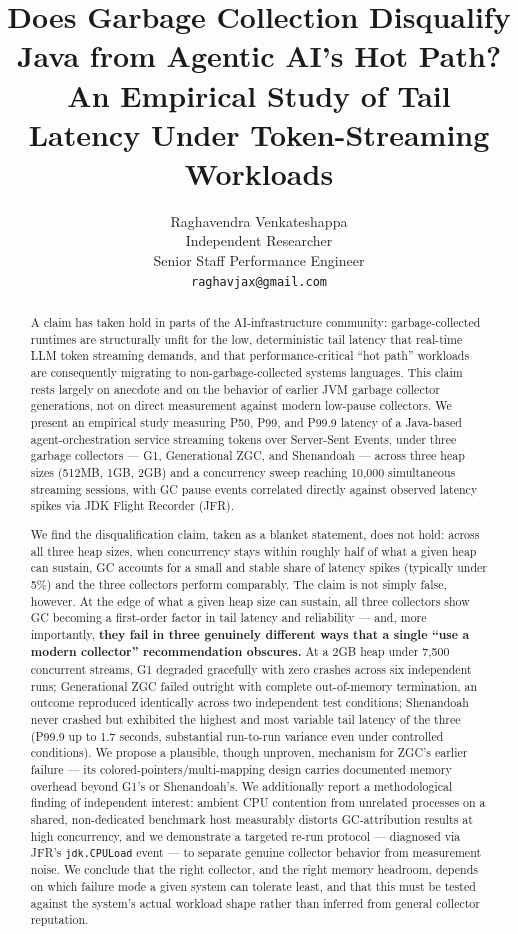 \documentclass[11pt]{article}
\title{\textbf{Does Garbage Collection Disqualify Java from Agentic AI's Hot Path?}\\
\large An Empirical Study of Tail Latency Under Token-Streaming Workloads}
\author{Raghavendra Venkateshappa \\
\small Independent Researcher \\
\small Senior Staff Performance Engineer \\
\small \texttt{raghavjax@gmail.com}}
\date{}
\newcommand{\code}[1]{\texttt{#1}}
\begin{document}
\maketitle

\begin{abstract}
A claim has taken hold in parts of the AI-infrastructure community: garbage-collected runtimes
are structurally unfit for the low, deterministic tail latency that real-time LLM token streaming
demands, and that performance-critical ``hot path'' workloads are consequently migrating to
non-garbage-collected systems languages. This claim rests largely on anecdote and on the
behavior of earlier JVM garbage collector generations, not on direct measurement against modern
low-pause collectors. We present an empirical study measuring P50, P99, and P99.9 latency of a
Java-based agent-orchestration service streaming tokens over Server-Sent Events, under three
garbage collectors --- G1, Generational ZGC, and Shenandoah --- across three heap sizes (512MB,
1GB, 2GB) and a concurrency sweep reaching 10{,}000 simultaneous streaming sessions, with GC pause
events correlated directly against observed latency spikes via JDK Flight Recorder (JFR).

We find the disqualification claim, taken as a blanket statement, does not hold: across all
three heap sizes, when concurrency stays within roughly half of what a given heap can sustain,
GC accounts for a small and stable share of latency spikes (typically under 5\%) and the three
collectors perform comparably. The claim is not simply false, however. At the edge of what a
given heap size can sustain, all three collectors show GC becoming a first-order factor in tail
latency and reliability --- and, more importantly, \textbf{they fail in three genuinely different
ways that a single ``use a modern collector'' recommendation obscures.} At a 2GB heap under
7{,}500 concurrent streams, G1 degraded gracefully with zero crashes across six independent runs;
Generational ZGC failed outright with complete out-of-memory termination, an outcome reproduced
identically across two independent test conditions; Shenandoah never crashed but exhibited the
highest and most variable tail latency of the three (P99.9 up to 1.7 seconds, substantial
run-to-run variance even under controlled conditions). We propose a plausible, though unproven,
mechanism for ZGC's earlier failure --- its colored-pointers/multi-mapping design carries
documented memory overhead beyond G1's or Shenandoah's. We additionally report a methodological
finding of independent interest: ambient CPU contention from unrelated processes on a shared,
non-dedicated benchmark host measurably distorts GC-attribution results at high concurrency, and
we demonstrate a targeted re-run protocol --- diagnosed via JFR's \code{jdk.CPULoad} event --- to
separate genuine collector behavior from measurement noise. We conclude that the right collector,
and the right memory headroom, depends on which failure mode a given system can tolerate least,
and that this must be tested against the system's actual workload shape rather than inferred
from general collector reputation.
\end{abstract}
\end{document}
